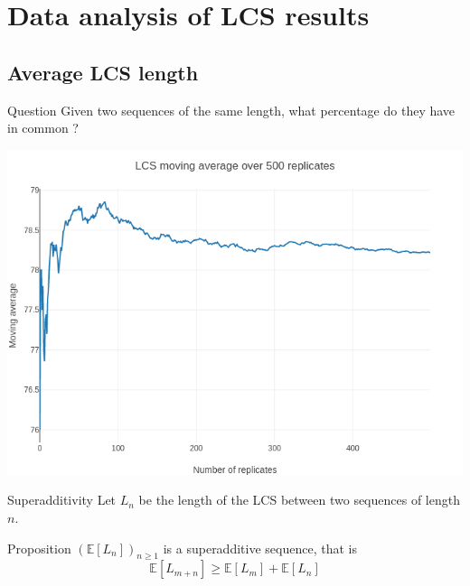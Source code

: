 \documentclass{beamer}
\begin{document}
\section{Data analysis of LCS results}
\subsection{Average LCS length}

\begin{frame}[standout]
  \begin{block}{Question}
    Given two sequences of the same length, what percentage do they have in common ?
  \end{block}
  \vspace{1cm}
\end{frame}

\begin{frame}
  \includegraphics[width=\textwidth]{img/lcs_length_ma.png}
\end{frame}

\begin{frame}{Superadditivity}
  Let \(L_n\) be the length of the LCS between two sequences of length \(n\). \\[.5cm]
  \begin{block}{Proposition}
    \(\left( \mathbb{E}[L_n] \right)_{n \geq 1}\) is a superadditive sequence, that is
    \[
      \mathbb{E}[L_{m+n}] \geq \mathbb{E}[L_{m}] + \mathbb{E}[L_{n}]
    \]
  \end{block}
\end{frame}
\end{document}
